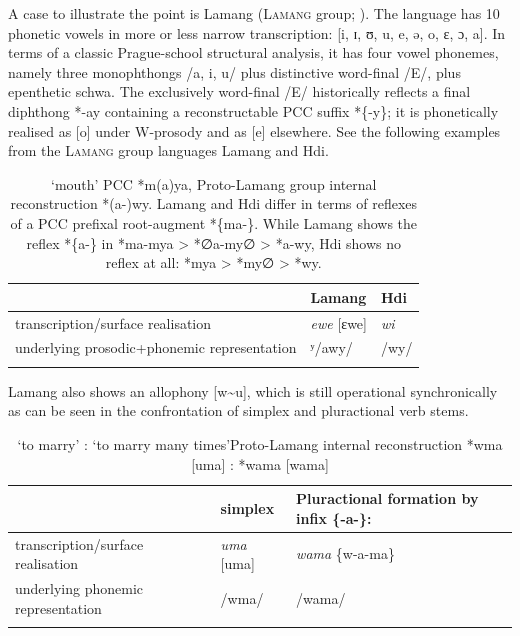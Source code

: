 \documentclass[output=paper]{langscibook}
\begin{document}
A case to illustrate the point is Lamang (\textsc{Lamang} group; \citealt{Wolff1983b,Wolff2015}). The language has 10 phonetic vowels in more or less narrow transcription: [i, ɪ, ʊ, u, e, ə, o, ɛ, ɔ, a]. In terms of a classic Prague-school structural analysis, it has four vowel phonemes, namely three monophthongs /a, i, u/ plus distinctive word-final /E/, plus epenthetic schwa. The exclusively word-final /E/ historically reflects a final diphthong *-ay containing a reconstructable PCC suffix *\{-y\}; it is phonetically realised as [o] under W-prosody and as [e] elsewhere. See the following examples from the \textsc{Lamang} group languages Lamang and Hdi.

\begin{table}
\caption{‘mouth’ PCC *m(a)ya, Proto-Lamang group internal reconstruction *(a-)wy. Lamang and Hdi differ in terms of reflexes of a PCC prefixal root-augment *\{ma-\}. While Lamang shows the reflex *\{a-\} in *ma-mya > *∅a-my∅ > *a-wy, Hdi shows no reflex at all: *mya >  *my∅ > *wy.}
\label{extab:wolff:9bis}
\begin{tabularx}{\textwidth}{Qll}
\lsptoprule
 & Lamang & Hdi\\
 \midrule
transcription/surface realisation & \textit{ewe} [ɛwe] & {\itshape wi}\\
underlying prosodic+phonemic representation & ʸ/awy/ & /wy/\\
\lspbottomrule
\end{tabularx}
\end{table}

Lamang also shows an allophony [w{\textasciitilde}u], which is still operational synchronically as can be seen in the confrontation of simplex and pluractional verb stems.

\begin{table}
    \label{extab:wolff:10}
\caption{‘to marry’ : ‘to marry many times’\newline Proto-Lamang internal reconstruction *wma [uma] : *wama [wama]
}
\begin{tabularx}{\textwidth}{llQ}
\lsptoprule
 & simplex & Pluractional formation by infix \{-a-\}:\\
 \midrule
transcription/surface realisation & \textit{uma} [uma] & \textit{wama} \{w-a-ma\}\\
underlying phonemic representation & /wma/ & /wama/  \\
\lspbottomrule
\end{tabularx}
\end{table}
\end{document}
